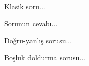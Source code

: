\documentclass[12 pt]{exam}
\newcommand{\tf}[1][{}]{%
\fillin[#1][0.75 cm]%
}
\begin{document}
\begin{questions}

\question[**] Klasik soru...

\begin{solution}
Sorunun cevabı...
\end{solution}



\question[**] Doğru-yanlış sorusu...

\begingroup
\renewcommand{\partlabel}{•}
\endgroup



\question[10] Boşluk doldurma sorusu...

\begingroup
\renewcommand{\partlabel}{•}
\endgroup


\end{questions}
\end{document}
